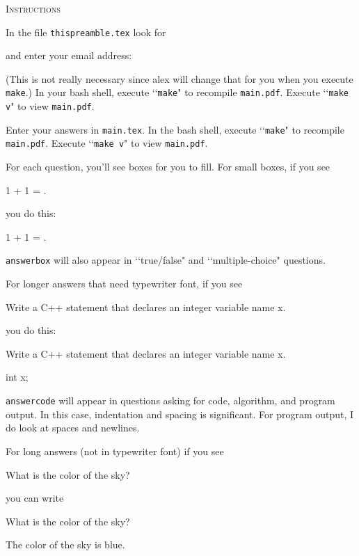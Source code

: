 \textsc{Instructions}

In the file \verb!thispreamble.tex! look for 
\begin{console}
\renewcommand\AUTHOR{} 
\end{console}
and enter your email address:
\begin{console}
\renewcommand\AUTHOR{jdoe5@cougars.ccis.edu} 
\end{console}
(This is not really necessary since alex will change that for you
when you execute \verb!make!.)
In your bash shell, execute \lq\lq \verb!make!" to recompile \verb!main.pdf!.
Execute \lq\lq \verb!make v!" to view \verb!main.pdf!.

Enter your answers in \verb!main.tex!.
In the bash shell, execute \lq\lq \verb!make!" to recompile \verb!main.pdf!.
Execute \lq\lq \verb!make v!" to view \verb!main.pdf!.

For each question, you'll see boxes for you to fill.
For small boxes, if you see
\begin{console}[frame=single=single,fontsize=\small]
1 + 1 = \answerbox{}.
\end{console}
you do this:
\begin{console}[frame=single=single,fontsize=\small]
1 + 1 = .
\end{console}
\verb!answerbox! will also appear in
\lq\lq true/false" and \lq\lq multiple-choice"
questions.

For longer answers that need typewriter font, if you see
\begin{console}[frame=single=single, fontsize=\small]
Write a C++ statement that declares an integer variable name x.
\begin{answercode}
\end{answercode}
\end{console}
you do this:
\begin{console}[frame=single=single, fontsize=\small]
Write a C++ statement that declares an integer variable name x.
\begin{answercode}
int x;
\end{answercode}
\end{console}
\verb!answercode! will appear in questions asking for
code, algorithm, and program output.
In this case, indentation and spacing is significant.
For program output, I do look at spaces and newlines.

For long answers (not in typewriter font) if you see
\begin{console}[frame=single=single, fontsize=\small]
What is the color of the sky?
\begin{answerlong}
\end{answerlong}
\end{console}
you can write
\begin{console}[frame=single=single, fontsize=\small]
What is the color of the sky?
\begin{answerlong}
The color of the sky is blue.
\end{answerlong}
\end{console}

